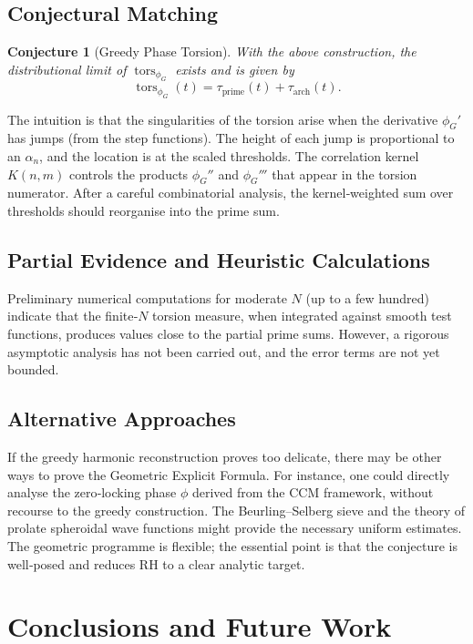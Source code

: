 \documentclass[12pt,a4paper,oneside]{book}
\newtheorem{conjecture}[theorem]{Conjecture}
\newcommand{\tors}{\operatorname{tors}}
\begin{document}
\section{Conjectural Matching}
\begin{conjecture}[Greedy Phase Torsion]
With the above construction, the distributional limit of \(\tors_{\phi_G}\) exists and is given by
\[
\tors_{\phi_G}(t) = \tau_{\text{prime}}(t) + \tau_{\text{arch}}(t).
\]
\end{conjecture}

The intuition is that the singularities of the torsion arise when the derivative \(\phi_G'\) has jumps (from the step functions).  The height of each jump is proportional to an \(\alpha_n\), and the location is at the scaled thresholds.  The correlation kernel \(K(n,m)\) controls the products \(\phi_G''\) and \(\phi_G'''\) that appear in the torsion numerator.  After a careful combinatorial analysis, the kernel‑weighted sum over thresholds should reorganise into the prime sum.

\section{Partial Evidence and Heuristic Calculations}
Preliminary numerical computations for moderate \(N\) (up to a few hundred) indicate that the finite‑\(N\) torsion measure, when integrated against smooth test functions, produces values close to the partial prime sums.  However, a rigorous asymptotic analysis has not been carried out, and the error terms are not yet bounded.

\section{Alternative Approaches}
If the greedy harmonic reconstruction proves too delicate, there may be other ways to prove the Geometric Explicit Formula.  For instance, one could directly analyse the zero‑locking phase \(\phi\) derived from the CCM framework, without recourse to the greedy construction.  The Beurling–Selberg sieve and the theory of prolate spheroidal wave functions might provide the necessary uniform estimates.  The geometric programme is flexible; the essential point is that the conjecture is well‑posed and reduces RH to a clear analytic target.

\chapter{Conclusions and Future Work}
\end{document}
